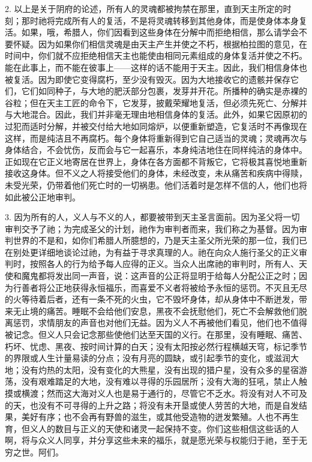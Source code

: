 2. 以上是关于阴府的论述，所有人的灵魂都被拘禁在那里，直到天主所定的时刻；那时祂将完成所有人的复活，不是将灵魂转移到其他身体，而是使身体本身复活。如果，哦，希腊人，你们因看到这些身体在分解中而拒绝相信，那么请学会不要怀疑。因为如果你们相信灵魂是由天主产生并使之不朽，根据柏拉图的意见，在时间中，你们就不应拒绝相信天主也能使由相同元素组成的身体复活并使之不朽。能在此事上，而不能在彼事上——这样的话不能用于天主。因此，我们相信身体也被复活。因为即使它变得腐朽，至少没有毁灭。因为大地接收它的遗骸并保存它们，它们如同种子，与大地的肥沃部分包裹，发芽并开花。所播种的确实是赤裸的谷粒；但在天主工匠的命令下，它发芽，披戴荣耀地复活，但必须先死亡、分解并与大地混合。因此，我们并非毫无理由地相信身体的复活。此外，如果它因原初的过犯而适时分解，并被交付给大地如同熔炉，以便重新塑造，它复活时不再像现在这样，而是纯洁且不再腐朽。每个身体将重新得到它自己适当的灵魂；灵魂再次与身体结合，不会忧伤，反而会与它一起喜乐，本身纯洁地住在同样纯洁的身体中。正如现在它正义地寄居在世界上，身体在各方面都不背叛它，它将极其喜悦地重新接收这身体。但不义之人将接受他们的身体，未经改变，未从痛苦和疾病中得赎，未受光荣，仍带着他们死亡时的一切祸患。他们活着时是怎样不信的人，他们也将如此被公正地审判。\par

3. 因为所有的人，义人与不义的人，都要被带到天主圣言面前。因为圣父将一切审判交予了祂；为完成圣父的计划，祂作为审判者而来，我们称之为基督。因为审判世界的不是和，如你们希腊人所臆想的，乃是天主圣父所光荣的那一位，我们已在别处更详细地谈论过祂，为有益于寻求真理的人。祂在向众人施行圣父的正义审判时，按照各人的行为给予每人应得的正义。当众人出席祂的审判时，所有人、天使和魔鬼都将发出同一声音，说：这声音的公正将显明于给每人分配公正之时；因为行善者将公正地获得永恒福乐，而喜爱不义者将被给予永恒的惩罚。不灭且无尽的火等待着后者，还有一条不死的火虫，它不毁坏身体，却从身体中不断迸发，带来无止境的痛苦。睡眠不会给他们安息，黑夜不会抚慰他们，死亡不会解救他们脱离惩罚，求情朋友的声音也对他们无益。因为义人不再被他们看见，他们也不值得被记念。但义人只会记念那些使他们达至天国的义行。在那里，没有睡眠、痛苦、朽坏、忧虑、黑夜、按时间计算的白天；没有太阳按必然行程横越天穹，标记季节的界限或人生计量易读的分点；没有月亮的圆缺，或引起季节的变化，或滋润大地；没有灼热的太阳，没有变化的大熊星，没有出现的猎户星，没有众多的星宿游荡，没有艰难踏足的大地，没有难以寻得的乐园居所；没有大海的狂吼，禁止人触摸或横渡；然而这大海对义人也是易于通行的，尽管它不乏水。将没有对人不可及的天，也没有不可寻得的上升之路；将没有未开垦或使人劳苦的大地，而是自发结果，美好有序；也不会再有野兽的滋生，或其他受造物的迸发繁殖。人也不再生育，但义人的数目与正义的天使和诸灵一起保持不变。你们这些相信这些话的人啊，将与众义人同享，并分享这些未来的福乐，就是愿光荣与权能归于祂，至于无穷之世。阿们。\par

